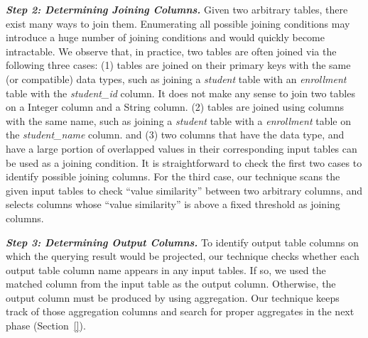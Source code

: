 \vspace{1mm}
\noindent\textit{\textbf{Step 2: Determining Joining Columns. }} Given two arbitrary tables, there exist many
ways to join them. Enumerating all possible joining conditions may introduce a huge number of joining
conditions and would quickly become intractable. We observe that, in practice, two tables are often joined via the following
three cases: (1) tables are joined on their primary keys with the same (or compatible) data types, such
as joining a \textit{student} table with an \textit{enrollment} table with the \textit{student\_id} column. It does not
make any sense to join two tables on a Integer column and a String column. (2) tables are joined
using columns with the same name, such as joining a \textit{student} table with a \textit{enrollment} table on the
\textit{student\_name} column. and (3) two columns that have the data type, and have a large portion of
overlapped values in their corresponding input tables can be used as a joining condition. It is straightforward to check the first 
two cases to identify possible joining columns. For the third case, our technique scans the given input tables to check ``value similarity''
between two arbitrary columns, and selects columns whose ``value similarity'' is above a fixed threshold as joining columns.

\vspace{1mm}
\noindent \textit{\textbf{Step 3: Determining Output Columns.}} To identify output table columns on
which the querying result would be projected, our technique checks whether each output
table column name appears in any input tables. If so, we used the matched column
from the input table as the output column. Otherwise, the output column
must be produced by using aggregation. Our technique keeps track of those aggregation columns
and search for proper aggregates in the next phase (Section~\ref{}). 


\vspace{1mm}

